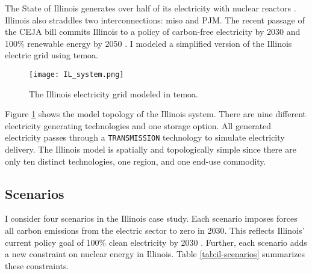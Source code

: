 The State of Illinois generates over half of its electricity with nuclear reactors
\cite{energy_information_administration_eia_nodate}.
Illinois also straddles two interconnections: \gls{miso} and PJM. The recent
passage of the CEJA bill commits Illinois to a policy of carbon-free electricity
by 2030 and 100\% renewable energy by 2050 \cite{harmon_climate_2021}.
I modeled a simplified version of the Illinois electric grid using \gls{temoa}.

\begin{figure}[H]
  \centering
  \texttt{[image: IL\_system.png]}
  \caption{The Illinois electricity grid modeled in \gls{temoa}.}
  \label{fig:ilsys}
\end{figure}

Figure \ref{fig:ilsys} shows the model topology of the Illinois system. There
are nine different electricity generating technologies and one storage option.
All generated electricity passes through a \texttt{TRANSMISSION} technology
to simulate electricity delivery. The Illinois model is spatially and topologically
simple since there are only ten distinct technologies, one region, and one
end-use commodity.

\subsection{Scenarios}
I consider four scenarios in the Illinois case study. Each scenario imposes forces
all carbon emissions from the electric sector to zero in 2030. This reflects Illinois'
current policy goal of 100\% clean electricity by 2030 \cite{office_of_governor_jb_pritzker_gov_2021}.
Further, each scenario adds a new constraint on nuclear energy in Illinois. Table
\ref{tab:il-scenarios} summarizes these constraints.

\begin{table}[H]
  \centering
  \caption{Summary of Illinois Case Study Scenarios}
  \label{tab:il-scenarios}
\end{table}

